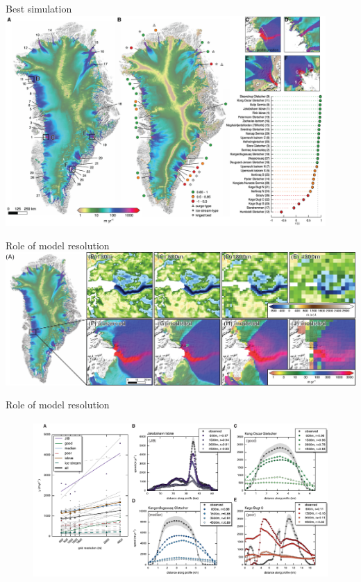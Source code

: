 \documentclass[hide notes,intlimits]{beamer}
\begin{document}
\begin{frame}{Best simulation}
  \includegraphics[height=8cm]{greenland-overview-3}
\end{frame}

\begin{frame}{Role of model resolution}
  \includegraphics[width=\textwidth]{jakobshavn-beds}
\end{frame}

\begin{frame}{Role of model resolution}
  \begin{figure}
    \includegraphics[height=6cm]{grid-resolution-4}
  \end{figure}
\end{frame}
\end{document}
